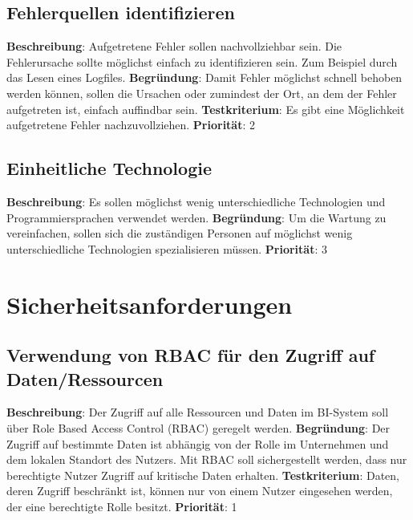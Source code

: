 \subsection{Fehlerquellen identifizieren} \label{sec:anforderungsspezifikation:fehlerquellenIdentifizieren}
\textbf{Beschreibung}: Aufgetretene Fehler sollen nachvollziehbar sein. Die Fehlerursache sollte möglichst einfach zu identifizieren sein. Zum Beispiel durch das Lesen eines Logfiles.
\newline \textbf{Begründung}: Damit Fehler möglichst schnell behoben werden können, sollen die Ursachen oder zumindest der Ort, an dem der Fehler aufgetreten ist, einfach auffindbar sein.
\newline \textbf{Testkriterium}: Es gibt eine Möglichkeit aufgetretene Fehler nachzuvollziehen.
\newline \textbf{Priorität}: 2

\subsection{Einheitliche Technologie} \label{sec:anforderungsspezifikation:einheitlicheTechnologie}
\textbf{Beschreibung}: Es sollen möglichst wenig unterschiedliche Technologien und Programmiersprachen verwendet werden.
\newline \textbf{Begründung}: Um die Wartung zu vereinfachen, sollen sich die zuständigen Personen auf möglichst wenig unterschiedliche Technologien spezialisieren müssen.
\newline \textbf{Priorität}: 3

\section{Sicherheitsanforderungen}

\subsection{Verwendung von RBAC für den Zugriff auf Daten/Ressourcen} \label{sec:anforderungsspezifikation:rbac}
\textbf{Beschreibung}: Der Zugriff auf alle Ressourcen und Daten im BI-System soll über Role Based Access Control (RBAC) geregelt werden.
\newline \textbf{Begründung}: Der Zugriff auf bestimmte Daten ist abhängig von der Rolle im Unternehmen und dem lokalen Standort des Nutzers. Mit RBAC soll sichergestellt werden, dass nur berechtigte Nutzer Zugriff auf kritische Daten erhalten.
\newline \textbf{Testkriterium}: Daten, deren Zugriff beschränkt ist, können nur von einem Nutzer eingesehen werden, der eine berechtigte Rolle besitzt.
\newline \textbf{Priorität}: 1


